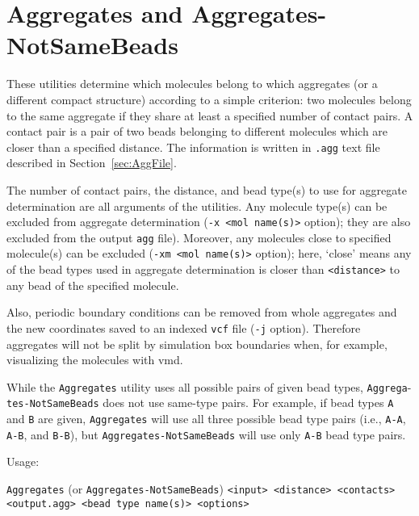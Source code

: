\section{Aggregates and Aggregates-NotSameBeads} \label{sec:Aggregates}

These utilities determine which molecules belong to which aggregates (or a
different compact structure) according to a simple criterion: two molecules
belong to the same aggregate if they share at least a specified number of
contact pairs. A contact pair is a pair of two beads belonging to different
molecules which are closer than a specified distance. The information is
written in \texttt{.agg} text file described in Section~\ref{sec:AggFile}.

The number of contact pairs, the distance, and bead type(s) to use for
aggregate determination are all arguments of the utilities.  Any molecule
type(s) can be excluded from aggregate determination (\texttt{-x <mol
name(s)>} option); they are also excluded from the output \texttt{agg}
file).  Moreover, any molecules close to specified molecule(s) can be
excluded (\texttt{-xm <mol name(s)>} option); here, `close' means any of
the bead types used in aggregate determination is closer than
\texttt{<distance>} to any bead of the specified molecule.

Also, periodic boundary conditions can be removed from whole aggregates and
the new coordinates saved to an indexed \texttt{vcf} file (\texttt{-j}
option). Therefore aggregates will not be split by simulation box
boundaries when, for example, visualizing the molecules with vmd.

While the \texttt{Aggregates} utility uses all possible pairs of given bead
types, \texttt{Aggrega}-\texttt{tes-NotSameBeads} does not use same-type pairs. For
example, if bead types \texttt{A} and \texttt{B} are given,
\texttt{Aggregates} will use all three possible bead type pairs (i.e.,
\texttt{A-A}, \texttt{A-B}, and \texttt{B-B}), but
\texttt{Aggregates-NotSameBeads} will use only \texttt{A-B} bead type
pairs.

Usage:

\noindent
\vspace{1em}
\texttt{Aggregates} (or \texttt{Aggregates-NotSameBeads}) \texttt{<input>
<distance> <contacts> <output.agg> <bead type name(s)> <options>}

